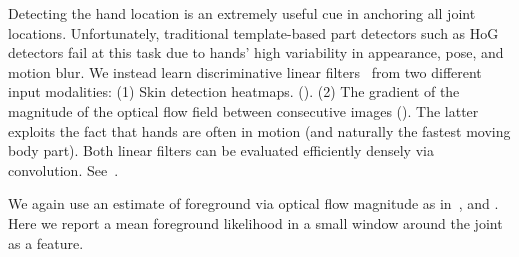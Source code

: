   Detecting the hand 
location is an extremely useful cue in anchoring all joint locations.  
Unfortunately, traditional template-based part detectors such as HoG detectors 
fail at this task due to hands' high variability in appearance, pose, and 
motion blur.  We instead learn discriminative linear filters~\citep{liblinear} 
from two different input modalities:  (1) Skin detection heatmaps.  
().  (2) The gradient of the magnitude of the optical flow field 
between consecutive images ().  The latter exploits the fact 
that hands are often in motion (and naturally the fastest moving body part).  
Both linear filters can be evaluated efficiently densely via convolution.  
See~.

We again use an estimate of foreground via optical flow magnitude as 
in~, and .  Here we report a mean 
foreground likelihood in a small window around the joint as a feature.

